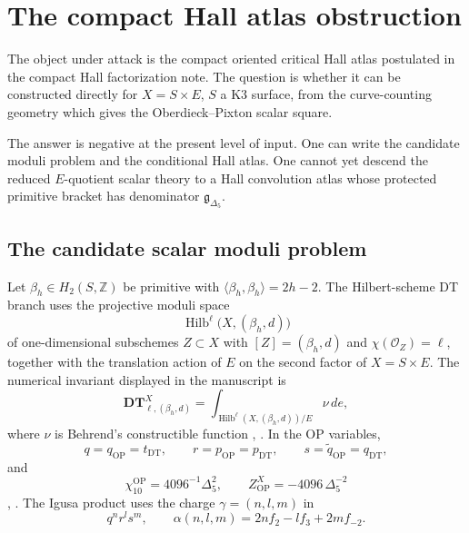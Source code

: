 \section{The compact Hall atlas obstruction}
\label{sec:compact-hall-atlas-obstruction}

\providecommand{\Z}{\mathbb Z}
\providecommand{\C}{\mathbb C}
\providecommand{\GammaBPS}{\Gamma_{\mathrm{BPS}}}
\providecommand{\Gammaeff}{\Gamma_{\mathrm{eff}}}
\providecommand{\Gammaact}{\Gamma_{\mathrm{act}}}
\providecommand{\Hall}{\mathcal H}
\providecommand{\Perf}{\operatorname{Perf}}
\providecommand{\Coh}{\operatorname{Coh}}
\providecommand{\Hilb}{\operatorname{Hilb}}
\providecommand{\Ext}{\operatorname{Ext}}
\providecommand{\RHom}{\operatorname{RHom}}
\providecommand{\BM}{\operatorname{BM}}
\providecommand{\Crit}{\operatorname{Crit}}
\providecommand{\Prim}{\operatorname{Prim}}
\providecommand{\sdim}{\operatorname{sdim}}
\providecommand{\BPS}{\mathrm{BPS}}

The object under attack is the compact oriented critical Hall atlas
postulated in the compact Hall factorization note.  The
question is whether it can be constructed directly for
\(X=S\times E\), \(S\) a K3 surface, from the curve-counting geometry
which gives the Oberdieck--Pixton scalar square.

The answer is negative at the present level of input.  One can write the
candidate moduli problem and the conditional Hall atlas.  One cannot yet
descend the reduced \(E\)-quotient scalar theory to a Hall convolution
atlas whose protected primitive bracket has denominator
\(\mathfrak g_{\Delta_5}\).

\subsection{The candidate scalar moduli problem}

Let \(\beta_h\in H_2(S,\Z)\) be primitive with
\(\langle \beta_h,\beta_h\rangle=2h-2\).  The Hilbert-scheme DT branch
uses the projective moduli space
\[
  \Hilb^{\ell}\bigl(X,(\beta_h,d)\bigr)
\]
of one-dimensional subschemes \(Z\subset X\) with
\([Z]=(\beta_h,d)\) and \(\chi(\mathcal O_Z)=\ell\), together with the
translation action of \(E\) on the second factor of \(X=S\times E\).
The numerical invariant displayed in the manuscript is
\[
  \mathbf{DT}^{X}_{\ell,(\beta_h,d)}
  =
  \int_{\Hilb^{\ell}(X,(\beta_h,d))/E}\nu\,de ,
\]
where \(\nu\) is Behrend's constructible function
\cite{BEHREND}, \cite{DT}.  In the OP variables,
\[
  q=q_{\mathrm{OP}}=t_{\mathrm{DT}},\qquad
  r=p_{\mathrm{OP}}=p_{\mathrm{DT}},\qquad
  s=\widetilde q_{\mathrm{OP}}=q_{\mathrm{DT}},
\]
and
\[
  \chi_{10}^{\mathrm{OP}}
  =
  4096^{-1}\Delta_5^2,\qquad
  Z^X_{\mathrm{OP}}=-4096\,\Delta_5^{-2}
\]
\cite{OB}, \cite{OPand}.  The Igusa product uses the charge
\(\gamma=(n,l,m)\) in
\[
  q^n r^l s^m,\qquad
  \alpha(n,l,m)=2n f_2-l f_3+2m f_{-2}.
\]

